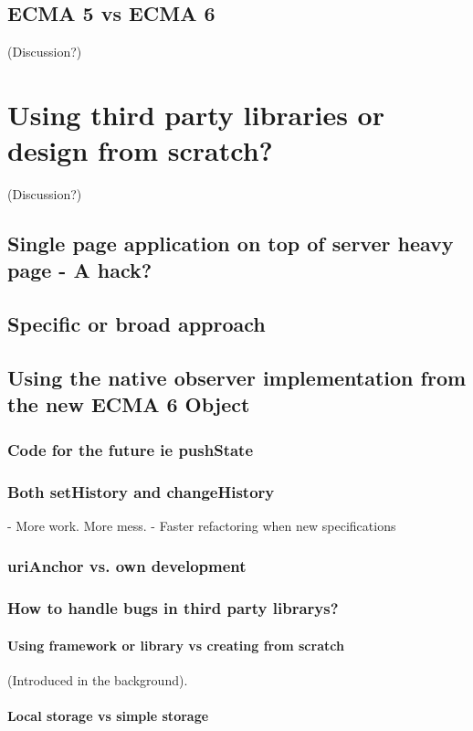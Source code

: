 \documentclass[english]{ifimaster}
\begin{document}
\subsection{ECMA 5 vs ECMA 6} (Discussion?)

\section{Using third party libraries or design from scratch?} (Discussion?)

\subsection{Single page application on top of server heavy page - A hack?}
\subsection{Specific or broad approach}
\subsection{Using the native observer implementation from the new ECMA 6 Object}
\subsubsection{Code for the future ie pushState} 
\subsubsection{Both setHistory and changeHistory} 
 - More work. More mess.
 - Faster refactoring when new specifications
\subsubsection{uriAnchor vs. own development} 
\subsubsection{How to handle bugs in third party librarys?} 
\paragraph{Using framework or library vs creating from scratch}  
(Introduced in the background).
\paragraph{Local storage vs simple storage} 
\end{document}
